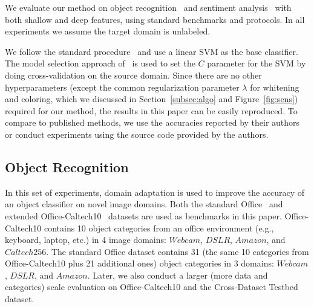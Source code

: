\documentclass[letterpaper]{article}
\begin{document}
We evaluate our method on object recognition~\cite{saenko2010adapting} and sentiment analysis~\cite{Blitzer07Biographies} with both shallow and deep features, using standard benchmarks and protocols. In all experiments we assume the target domain is unlabeled.

We follow the standard procedure~\cite{sasb,decaf} and use a linear SVM as the base classifier. The model selection approach of~\cite{sasb} is used to set the $C$ parameter for the SVM by doing cross-validation on the source domain. Since there are no other hyperparameters (except the common regularization parameter $\lambda$ for whitening and coloring, which we discussed in Section~\ref{subsec:algo} and Figure~\ref{fig:sens}) required for our method, the results in this paper can be easily reproduced. To compare to published methods, we use the accuracies reported by their authors or conduct experiments using the source code provided by the authors.

\subsection{Object Recognition}
\label{subsec:recog}
In this set of experiments, domain adaptation is used to improve the accuracy of an object classifier on novel image domains.
Both the standard Office~\cite{saenko2010adapting} and extended Office-Caltech10~\cite{gfk} datasets are used as benchmarks in this paper. Office-Caltech10 contains 10 object categories from an office environment (e.g., keyboard, laptop, etc.) in 4 image domains: $Webcam$, $DSLR$, $Amazon$, and $Caltech256$. The standard Office dataset contains 31 (the same 10 categories from Office-Caltech10 plus 21 additional ones) object categories in 3 domains: $Webcam$, $DSLR$, and $Amazon$. Later, we also conduct a larger (more data and categories) scale evaluation on Office-Caltech10 and the Cross-Dataset Testbed~\cite{cross_dataset} dataset.
\end{document}
